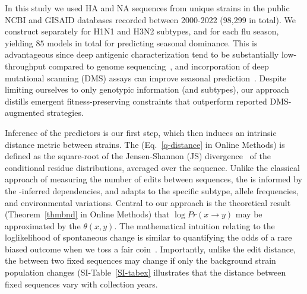 \documentclass[onecolumn, compsoc,10pt]{IEEEtran}
\def\METHODS{Online Methods\xspace}
\begin{document}
In this study we used  HA and NA  sequences from   unique \infl strains in the public NCBI and GISAID databases recorded between 2000-2022 (98,299 in total). We  construct  separately for H1N1 and H3N2 subtypes, and for each flu season, yielding $85$ models in total for predicting seasonal dominance. %
This is advantageous since deep antigenic characterization  tend to be substantially  low-throughput compared to genome sequencing~\cite{wood2012reproducibility}, and  incorporation of  deep mutational scanning (DMS) assays  can improve seasonal prediction~\cite{huddleston2020integrating}. Despite limiting ourselves to only genotypic  information (and subtypes), our approach  distills  emergent  fitness-preserving constraints   that outperform reported DMS-augmented strategies.

Inference of the \enet predictors is our first step, which then induces  an intrinsic distance metric between strains. The \qdist  (Eq.~\eqref{q-distance} in \METHODS) is defined as the square-root of the Jensen-Shannon (JS) divergence~\cite{cover} of the conditional residue distributions, averaged over the sequence. Unlike the classical approach of measuring the number of edits between sequences, the \qdist is informed by the \enet-inferred  dependencies, and adapts to the specific subtype, allele frequencies, and environmental variations. Central to our approach is the theoretical result (Theorem~\ref{thmbnd} in \METHODS) that   $\log Pr(x \rightarrow y )$   may be approximated by the  \qdist $\theta(x,y)$. The mathematical intuition  relating  \qdist  to the loglikelihood of spontaneous change  is similar to quantifying the  odds of  a rare biased outcome when we  toss a fair coin~\cite{varadhan2010large}. %
Importantly, unlike the edit distance, the \qdist  between two fixed sequences may change  if only the background strain population changes (SI-Table~\ref{SI-tabex} illustrates that  the distance between  fixed  sequences vary with collection years.%
\end{document}
